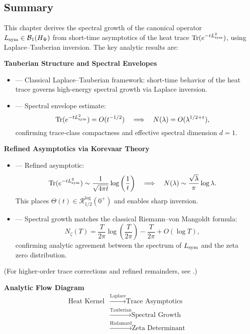 \subsection*{Summary}

This chapter derives the spectral growth of the canonical operator \( L_{\mathrm{sym}} \in \mathcal{B}_1(H_{\Psi}) \) from short-time asymptotics of the heat trace \( \operatorname{Tr}(e^{-t L_{\mathrm{sym}}^2}) \), using Laplace–Tauberian inversion. The key analytic results are:

\textbf{Tauberian Structure and Spectral Envelopes}
\begin{itemize}
  \item {} — Classical Laplace–Tauberian framework: short-time behavior of the heat trace governs high-energy spectral growth via Laplace inversion.

  \item {} — Spectral envelope estimate:
  \[
  \operatorname{Tr}(e^{-t L_{\mathrm{sym}}^2}) = O(t^{-1/2}) \quad \Longrightarrow \quad N(\lambda) = O(\lambda^{1/2+\varepsilon}),
  \]
  confirming trace-class compactness and effective spectral dimension \( d = 1 \).
\end{itemize}

\textbf{Refined Asymptotics via Korevaar Theory}
\begin{itemize}
  \item {} — Refined asymptotic:
  \[
  \operatorname{Tr}(e^{-t L_{\mathrm{sym}}^2}) \sim \frac{1}{\sqrt{4\pi t}} \log\left( \frac{1}{t} \right)
  \quad \Longrightarrow \quad
  N(\lambda) \sim \frac{\sqrt{\lambda}}{\pi} \log \lambda.
  \]
  This places \( \Theta(t) \in \mathcal{R}_{1/2}^{\log}(0^+) \) and enables sharp inversion.

  \item {} — Spectral growth matches the classical Riemann–von Mangoldt formula:
  \[
  N_\zeta(T) = \frac{T}{2\pi} \log\left( \frac{T}{2\pi} \right) - \frac{T}{2\pi} + O(\log T),
  \]
  confirming analytic agreement between the spectrum of \( L_{\mathrm{sym}} \) and the zeta zero distribution.
\end{itemize}

\medskip
\noindent
(For higher-order trace corrections and refined remainders, see .)

\vspace{0.5em}

\textbf{Analytic Flow Diagram}
\[
\begin{aligned}
\text{Heat Kernel}
&\xrightarrow{\text{Laplace}} \text{Trace Asymptotics} \\
&\xrightarrow{\text{Tauberian}} \text{Spectral Growth} \\
&\xrightarrow{\text{Hadamard}} \text{Zeta Determinant}
\end{aligned}
\]

